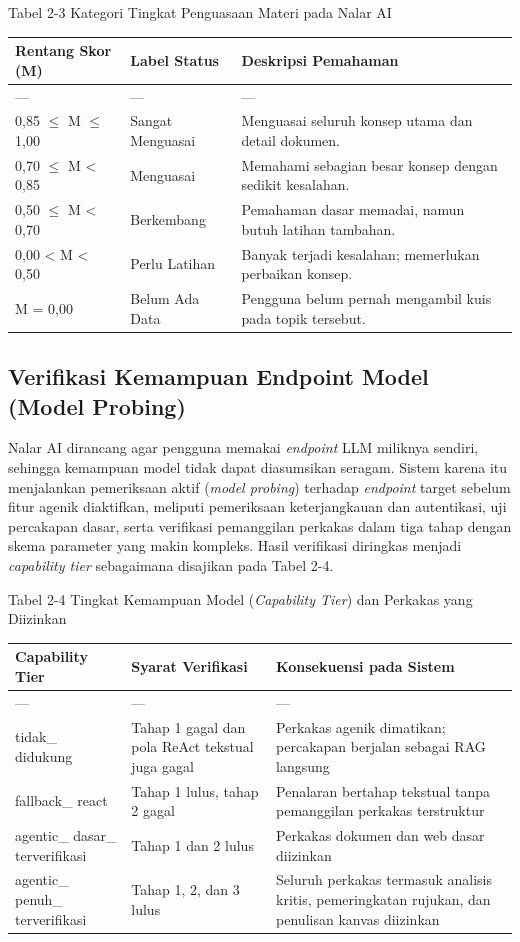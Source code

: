 \documentclass[12pt,a4paper]{article}
\begin{document}
Tabel 2-3	Kategori Tingkat Penguasaan Materi pada Nalar AI

\begin{table}[h]
\centering
\begin{tabular}{lll}
\toprule
Rentang Skor (M) & Label Status & Deskripsi Pemahaman \\
\midrule
--- & --- & --- \\
0,85 $\le$ M $\le$ 1,00 & Sangat Menguasai & Menguasai seluruh konsep utama dan detail dokumen. \\
0,70 $\le$ M \textless{} 0,85 & Menguasai & Memahami sebagian besar konsep dengan sedikit kesalahan. \\
0,50 $\le$ M \textless{} 0,70 & Berkembang & Pemahaman dasar memadai, namun butuh latihan tambahan. \\
0,00 \textless{} M \textless{} 0,50 & Perlu Latihan & Banyak terjadi kesalahan; memerlukan perbaikan konsep. \\
M = 0,00 & Belum Ada Data & Pengguna belum pernah mengambil kuis pada topik tersebut. \\
\bottomrule
\end{tabular}
\end{table}
\subsection*{Verifikasi Kemampuan Endpoint Model (Model Probing)}
Nalar AI dirancang agar pengguna memakai \textit{endpoint} LLM miliknya sendiri, sehingga kemampuan model tidak dapat diasumsikan seragam. Sistem karena itu menjalankan pemeriksaan aktif (\textit{model probing}) terhadap \textit{endpoint} target sebelum fitur agenik diaktifkan, meliputi pemeriksaan keterjangkauan dan autentikasi, uji percakapan dasar, serta verifikasi pemanggilan perkakas dalam tiga tahap dengan skema parameter yang makin kompleks. Hasil verifikasi diringkas menjadi \textit{capability tier} sebagaimana disajikan pada Tabel 2-4.

Tabel 2-4	Tingkat Kemampuan Model (\textit{Capability Tier}) dan Perkakas yang Diizinkan

\begin{table}[h]
\centering
\begin{tabular}{lll}
\toprule
Capability Tier & Syarat Verifikasi & Konsekuensi pada Sistem \\
\midrule
--- & --- & --- \\
tidak\_ didukung & Tahap 1 gagal dan pola ReAct tekstual juga gagal & Perkakas agenik dimatikan; percakapan berjalan sebagai RAG langsung \\
fallback\_ react & Tahap 1 lulus, tahap 2 gagal & Penalaran bertahap tekstual tanpa pemanggilan perkakas terstruktur \\
agentic\_ dasar\_ terverifikasi & Tahap 1 dan 2 lulus & Perkakas dokumen dan web dasar diizinkan \\
agentic\_ penuh\_ terverifikasi & Tahap 1, 2, dan 3 lulus & Seluruh perkakas termasuk analisis kritis, pemeringkatan rujukan, dan penulisan kanvas diizinkan \\
\bottomrule
\end{tabular}
\end{table}
\end{document}
